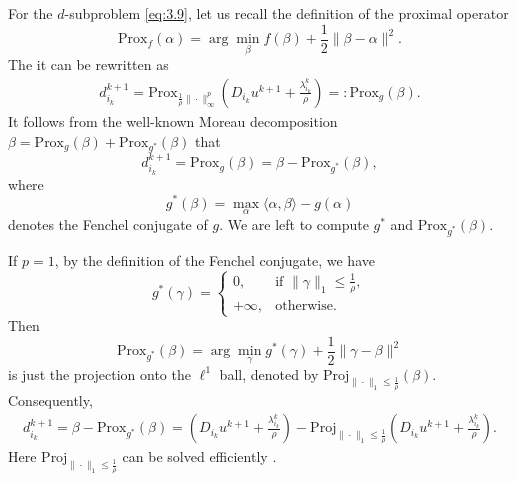 \documentclass{article}
\theoremstyle{definition}
\begin{document}
For the $d$-subproblem \eqref{eq:3.9},
let us recall the definition of the proximal operator
  \begin{equation*}
  \mbox{Prox}_{f}(\alpha)=\arg\min_{\beta} f(\beta)+ \frac{1}{2}\|\beta-\alpha\|^2.
\end{equation*}
The it can be rewritten as
\begin{align*}
  d_{i_k}^{k+1}
  =\mbox{Prox}_{\frac{1}{\rho}\|\cdot\|^p_\infty}
  \left(D_{i_k}u^{k+1}+\frac{\lambda_{i_k}^{k}}{\rho}\right)
  =:\mbox{Prox}_{g}
  \left(\beta\right).
\end{align*}
It follows from the well-known Moreau decomposition
$\beta=\mbox{Prox}_{g}\left(\beta\right)+\mbox{Prox}_{g^*} \left(\beta\right)$
that
\begin{equation}\label{eq:2.3a}
  d_{i_k}^{k+1}=\mbox{Prox}_{g}\left(\beta\right)
  =\beta-\mbox{Prox}_{g^*}\left(\beta\right),
\end{equation}
where
\begin{equation*}
  g^*(\beta)=\max_{\alpha}\langle \alpha,\beta\rangle -g(\alpha)
\end{equation*}
denotes the Fenchel conjugate of $g$.
We are left to compute $g^*$ and $\mbox{Prox}_{g^*}\left(\beta\right)$.

If $p=1$, by the definition of the Fenchel conjugate, we have
\begin{equation*}
  g^*(\gamma)=
  \begin{cases}
    0, & \mbox{if } \|\gamma\|_1\leq \frac{1}{\rho}, \\
    +\infty, & \mbox{otherwise}.
  \end{cases}
\end{equation*}
Then
\[
  \mbox{Prox}_{g^*}\left(\beta\right)
  =\arg\min_{\gamma}
  g^*(\gamma)
  +\frac{1}{2}\|\gamma-\beta\|^2
\]
is just the projection onto the $\ell^1$ ball, denoted by $\mbox{Proj}_{\|\cdot\|_1\leq \frac{1}{\rho}}(\beta)$.
Consequently,
\begin{align*}
  d_{i_k}^{k+1}
  =\beta-\mbox{Prox}_{g^*}
  \left(\beta\right)
  =\left(D_{i_k}u^{k+1}+\frac{\lambda_{i_k}^{k}}{\rho}\right)
  -\mbox{Proj}_{\|\cdot\|_1\leq \frac{1}{\rho}}\left(D_{i_k}u^{k+1}+\frac{\lambda_{i_k}^{k}}{\rho}\right).
\end{align*}
Here $\mbox{Proj}_{\|\cdot\|_1\leq \frac{1}{\rho}}$ can be solved efficiently \cite{condat2016fast}.
\end{document}
